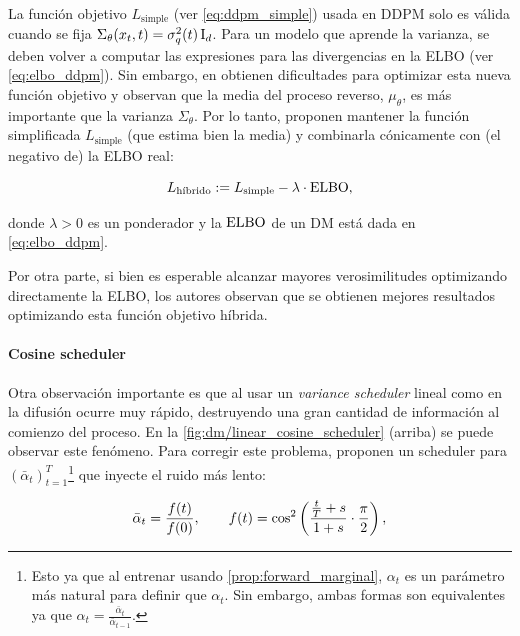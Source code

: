 La función objetivo $L_{\text{simple}}$ (ver \eqref{eq:ddpm_simple}) usada en DDPM solo es válida cuando se fija $\Sigma_\theta(x_t,t) = \sigma_q^2(t)\operatorname{I}_{d}$. Para un modelo que aprende la varianza, se deben volver a computar las expresiones para las divergencias en la ELBO (ver \eqref{eq:elbo_ddpm}). Sin embargo, en \cite{nichol2021improved} obtienen dificultades para optimizar esta nueva función objetivo y observan que la media del proceso reverso, $\mu_\theta$, es más importante que la varianza $\Sigma_\theta$. Por lo tanto, proponen mantener la función simplificada $L_{\text{simple}}$ (que estima bien la media) y combinarla cónicamente con (el negativo de) la ELBO real:

\begin{equation*}
    L_{\text{híbrido}} := L_{\text{simple}} - \lambda\cdot\operatorname{ELBO} ,
\end{equation*}

donde $\lambda>0$ es un ponderador y la $\operatorname{ELBO}$ de un DM está dada en \eqref{eq:elbo_ddpm}.

Por otra parte, si bien es esperable alcanzar mayores verosimilitudes optimizando directamente la ELBO, los autores observan que se obtienen mejores resultados optimizando esta función objetivo híbrida.

\paragraph{Cosine scheduler}

Otra observación importante es que al usar un \textit{variance scheduler} lineal como en \cite{ho2020denoising} la difusión ocurre muy rápido, destruyendo una gran cantidad de información al comienzo del proceso. En la \autoref{fig:dm/linear_cosine_scheduler} (arriba) se puede observar este fenómeno. Para corregir este problema, proponen un scheduler para $(\bar\alpha_t)_{t=1}^T$\footnote{Esto ya que al entrenar usando \eqref{prop:forward_marginal}, $\alpha_t$ es un parámetro más natural para definir que $\alpha_t$. Sin embargo, ambas formas son equivalentes ya que $\alpha_t=\frac{\bar\alpha_t}{\bar\alpha_{t-1}}$.} que inyecte el ruido más lento:

\begin{equation*}
    \bar\alpha_t = \frac{f(t)}{f(0)},\qquad f(t)=\cos^2\left(\frac{\frac{t}{T}+s}{1+s}\cdot\frac{\pi}{2}\right) ,
\end{equation*}


